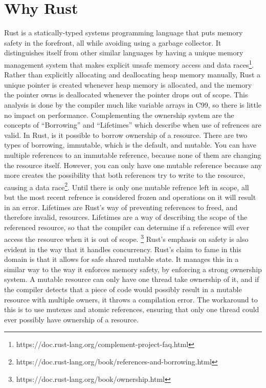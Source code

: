 \documentclass{acm_proc_article-sp}
\begin{document}
\section{Why Rust}
Rust is a statically-typed systems programming language that puts memory safety in the forefront, all while avoiding using a garbage collector. It distinguishes itself from other similar languages by having a unique memory management system that makes explicit unsafe memory access and data races\footnote{https://doc.rust-lang.org/complement-project-faq.html}. Rather than explicitly allocating and deallocating heap memory manually, Rust a unique pointer is created whenever heap memory is allocated, and the memory the pointer owns is deallocated whenever the pointer drops out of scope. This analysis is done by the compiler much like variable arrays in C99, so there is little no impact on performance. Complementing the ownership system are the concepts of “Borrowing” and “Lifetimes” which describe when use of refrences are valid.
In Rust, is it possible to borrow ownership of a resource. There are two types of borrowing, immutable, which is the default, and mutable. You can have multiple references to an immutable reference, because none of them are changing the resource itself. However, you can only have one mutable reference because any more creates the possibility that both references try to write to the resource, causing a data race\footnote{https://doc.rust-lang.org/book/references-and-borrowing.html}. Until there is only one mutable refrence left in scope, all but the most recent refrence is considered frozen and operations on it will result in an error.
Lifetimes are Rust's way of preventing references to freed, and therefore invalid, resources. Lifetimes are a way of describing the scope of the referenced resource, so that the compiler can determine if a reference will ever access the resource when it is out of scope. \footnote{https://doc.rust-lang.org/book/ownership.html}
Rust's emphasis on safety is also evident in the way that it handles concurrency. Rust's claim to fame in this domain is that it allows for safe shared mutable state. It manages this in a similar way to the way it enforces memory safety, by enforcing a strong ownership system. A mutable resource can only have one thread take ownership of it, and if the compiler detects that a piece of code would possibly result in a mutable resource with multiple owners, it throws a compilation error. The workaround to this is to use mutexes and atomic references, ensuring that only one thread could ever possibly have ownership of a resource.
\end{document}
